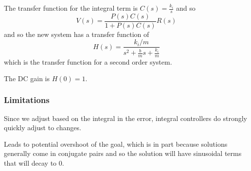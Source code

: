 \documentclass[11pt]{article}
\begin{document}
The transfer function for the integral term is \(C(s) = \frac{k_{i}}{s}\) and so
$$
V(s) = \frac{P(s)C(s)}{1 + P(s) C(s)}R(s)
$$
and so the new system has a transfer function of
$$
H(s) = \frac{k_{i}/m}{s^{2} + \frac{b}{m}s + \frac{k_{i}}{m}}
$$
which is the transfer function for a second order system.

The DC gain is \(H(0) = 1\).
\subsubsection{Limitations}
\label{sec:org2d55147}
Since we adjust based on the integral in the error, integral controllers do
strongly quickly adjust to changes.

Leads to potential overshoot of the goal, which is in part because solutions
generally come in conjugate pairs and so the solution will have sinusoidal
terms that will decay to 0.
\end{document}
